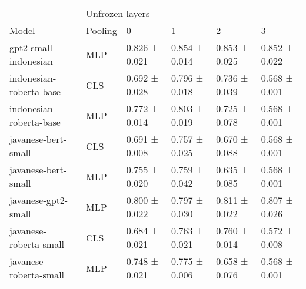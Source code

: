 \begin{tabular}{llllll}
\toprule
                        & \multicolumn{4}{l}{Unfrozen layers} \\
                  Model & Pooling &               0 &             1 &             2 &             3 \\
\midrule
  gpt2-small-indonesian &     MLP &   0.826 ± 0.021 & 0.854 ± 0.014 & 0.853 ± 0.025 & 0.852 ± 0.022 \\
indonesian-roberta-base &     CLS &   0.692 ± 0.028 & 0.796 ± 0.018 & 0.736 ± 0.039 & 0.568 ± 0.001 \\
indonesian-roberta-base &     MLP &   0.772 ± 0.014 & 0.803 ± 0.019 & 0.725 ± 0.078 & 0.568 ± 0.001 \\
    javanese-bert-small &     CLS &   0.691 ± 0.008 & 0.757 ± 0.025 & 0.670 ± 0.088 & 0.568 ± 0.001 \\
    javanese-bert-small &     MLP &   0.755 ± 0.020 & 0.759 ± 0.042 & 0.635 ± 0.085 & 0.568 ± 0.001 \\
    javanese-gpt2-small &     MLP &   0.800 ± 0.022 & 0.797 ± 0.030 & 0.811 ± 0.022 & 0.807 ± 0.026 \\
 javanese-roberta-small &     CLS &   0.684 ± 0.021 & 0.763 ± 0.021 & 0.760 ± 0.014 & 0.572 ± 0.008 \\
 javanese-roberta-small &     MLP &   0.748 ± 0.021 & 0.775 ± 0.006 & 0.658 ± 0.076 & 0.568 ± 0.001 \\
\bottomrule
\end{tabular}